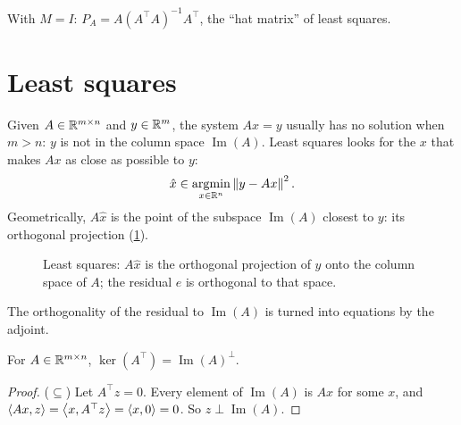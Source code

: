 \begin{notechapter}
With $M = I$: $P_A = A(A^\top A)^{-1}A^\top$, the ``hat matrix'' of least squares.

\section{Least squares}\label{adjoint-operator:sec:least-squares}

Given $A\in\mathbb{R}^{m\times n}$ and $y\in\mathbb{R}^m$, the system $Ax = y$ usually has no solution
when $m>n$: $y$ is not in the column space $\operatorname{Im}(A)$. Least squares
looks for the $x$ that makes $Ax$ as close as possible to $y$:
\[
  \hat x\in\operatorname*{argmin}_{x\in\mathbb{R}^n}\left\|y - Ax\right\|^2 .
\]
Geometrically, $A\hat x$ is the point of the subspace $\operatorname{Im}(A)$ closest
to $y$: its orthogonal projection (\cref{adjoint-operator:fig:ls}).

\begin{figure}[ht]
\centering
{}
\caption{Least squares: $A\hat x$ is the orthogonal projection of $y$ onto the column
space of $A$; the residual $e$ is orthogonal to that space.}
\label{adjoint-operator:fig:ls}
\end{figure}

The orthogonality of the residual to $\operatorname{Im}(A)$ is turned into equations by
the adjoint.

\begin{theorem}\label{adjoint-operator:thm:ker}
For $A\in\mathbb{R}^{m\times n}$, $\ker(A^\top) = \operatorname{Im}(A)^\perp$.
\end{theorem}

\begin{proof}
($\subseteq$) Let $A^\top z = 0$. Every element of $\operatorname{Im}(A)$ is $Ax$ for some
$x$, and $\left\langle Ax, z \right\rangle = \left\langle x, A^\top z \right\rangle = \left\langle x, 0 \right\rangle = 0$. So $z\perp\operatorname{Im}(A)$.


\end{proof}
\end{notechapter}
